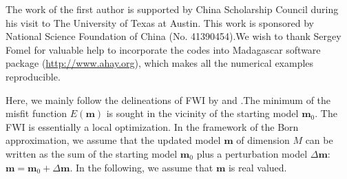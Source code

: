 The work of the first author is supported by China Scholarship Council during his visit to The University of Texas at Austin. 
This work is sponsored by National Science Foundation of China (No. 41390454).We wish to thank Sergey Fomel for valuable help to incorporate the codes into Madagascar software package \citep{m8r} (\url{http://www.ahay.org}), which makes all the numerical examples reproducible.


\label{app:misfit}

Here, we mainly follow the delineations of FWI by \cite{pratt1998gauss} and  \cite{virieux2009overview}.The minimum of the misfit function $E(\textbf{m})$ is sought in the vicinity of the starting model $\textbf{m}_0$. The FWI is essentially a local optimization.
In the framework of the Born approximation, we assume that the updated model $\textbf{m}$ of dimension $M$ can be written as the sum of the starting model $\textbf{m}_0$ plus a perturbation model $\Delta \textbf{m}$: $\textbf{m}=\textbf{m}_0+\Delta \textbf{m}$. In the following, we assume that $\textbf{m}$ is real valued.

